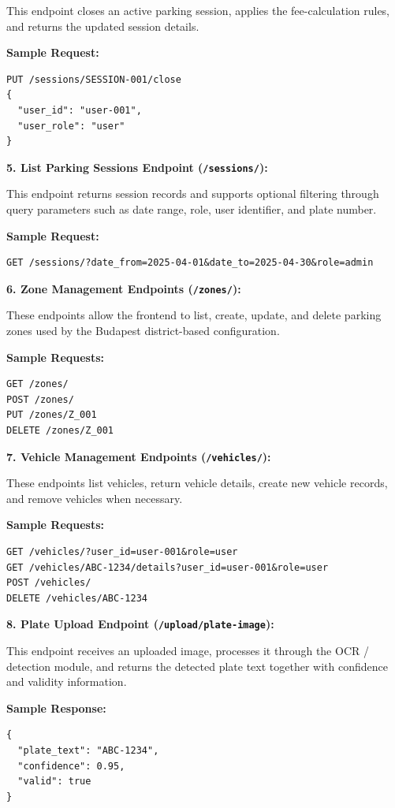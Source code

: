 \documentclass[12pt,a4paper,oneside]{report}
\begin{document}
This endpoint closes an active parking session, applies the fee-calculation rules, and returns the updated session details.

\textbf{Sample Request:}
\begin{verbatim}
PUT /sessions/SESSION-001/close
{
  "user_id": "user-001",
  "user_role": "user"
}
\end{verbatim}

\textbf{5. List Parking Sessions Endpoint (\texttt{/sessions/}):}

This endpoint returns session records and supports optional filtering through query parameters such as date range, role, user identifier, and plate number.

\textbf{Sample Request:}
\begin{verbatim}
GET /sessions/?date_from=2025-04-01&date_to=2025-04-30&role=admin
\end{verbatim}

\textbf{6. Zone Management Endpoints (\texttt{/zones/}):}

These endpoints allow the frontend to list, create, update, and delete parking zones used by the Budapest district-based configuration.

\textbf{Sample Requests:}
\begin{verbatim}
GET /zones/
POST /zones/
PUT /zones/Z_001
DELETE /zones/Z_001
\end{verbatim}

\textbf{7. Vehicle Management Endpoints (\texttt{/vehicles/}):}

These endpoints list vehicles, return vehicle details, create new vehicle records, and remove vehicles when necessary.

\textbf{Sample Requests:}
\begin{verbatim}
GET /vehicles/?user_id=user-001&role=user
GET /vehicles/ABC-1234/details?user_id=user-001&role=user
POST /vehicles/
DELETE /vehicles/ABC-1234
\end{verbatim}

\textbf{8. Plate Upload Endpoint (\texttt{/upload/plate-image}):}

This endpoint receives an uploaded image, processes it through the OCR / detection module, and returns the detected plate text together with confidence and validity information.

\textbf{Sample Response:}
\begin{verbatim}
{
  "plate_text": "ABC-1234",
  "confidence": 0.95,
  "valid": true
}
\end{verbatim}
\end{document}
